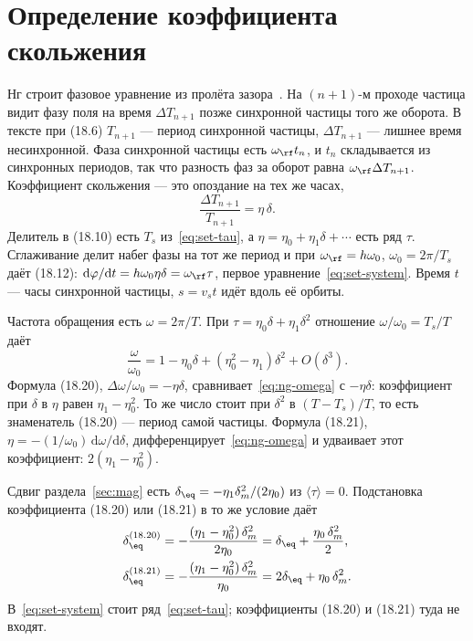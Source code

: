 \section{Определение коэффициента скольжения}
\label{sec:ng}

Нг строит фазовое уравнение из пролёта зазора~\cite{Ng2006}. На $(n{+}1)$-м проходе частица видит фазу поля на время $\Delta T_{n+1}$ позже синхронной частицы того же оборота. В тексте при (18.6) $T_{n+1}$ --- период синхронной частицы, $\Delta T_{n+1}$ --- лишнее время несинхронной. Фаза синхронной частицы есть $\omega_\rf t_n$, и $t_n$ складывается из синхронных периодов, так что разность фаз за оборот равна $\omega_\rf\Delta T_{n+1}$. Коэффициент скольжения --- это опоздание на тех же часах,
\begin{equation}
\label{eq:ng-def}
\frac{\Delta T_{n+1}}{T_{n+1}}=\eta\,\delta.
\end{equation}
Делитель в (18.10) есть $T_s$ из~\eqref{eq:set-tau}, а $\eta=\eta_0+\eta_1\delta+\cdots$ есть ряд $\tau$. Сглаживание делит набег фазы на тот же период и при $\omega_\rf=h\omega_0$, $\omega_0=2\pi/T_s$ даёт (18.12): $\mathrm{d}\varphi/\mathrm{d}t=h\omega_0\eta\delta=\omega_\rf\tau$, первое уравнение~\eqref{eq:set-system}. Время $t$ --- часы синхронной частицы, $s=v_s t$ идёт вдоль её орбиты.

Частота обращения есть $\omega=2\pi/T$. При $\tau=\eta_0\delta+\eta_1\delta^2$ отношение $\omega/\omega_0=T_s/T$ даёт
\begin{equation}
\label{eq:ng-omega}
\frac{\omega}{\omega_0}
=1-\eta_0\delta+(\eta_0^2-\eta_1)\delta^2+O(\delta^3).
\end{equation}
Формула (18.20), $\Delta\omega/\omega_0=-\eta\delta$, сравнивает~\eqref{eq:ng-omega} с $-\eta\delta$: коэффициент при $\delta$ в $\eta$ равен $\eta_1-\eta_0^2$. То же число стоит при $\delta^2$ в $(T-T_s)/T$, то есть знаменатель (18.20) --- период самой частицы. Формула (18.21), $\eta=-(1/\omega_0)\,\mathrm{d}\omega/\mathrm{d}\delta$, дифференцирует~\eqref{eq:ng-omega} и удваивает этот коэффициент: $2(\eta_1-\eta_0^2)$.

Сдвиг раздела~\ref{sec:mag} есть $\delta_\eq=-\eta_1\delta_m^2/(2\eta_0)$ из $\langle\tau\rangle=0$. Подстановка коэффициента (18.20) или (18.21) в то же условие даёт
\begin{align}
\label{eq:ng-deq}
\delta_\eq^{(18.20)}
&=-\frac{(\eta_1-\eta_0^2)\,\delta_m^2}{2\eta_0}
=\delta_\eq+\frac{\eta_0\,\delta_m^2}{2},
\\
\delta_\eq^{(18.21)}
&=-\frac{(\eta_1-\eta_0^2)\,\delta_m^2}{\eta_0}
=2\delta_\eq+\eta_0\,\delta_m^2.
\end{align}
В~\eqref{eq:set-system} стоит ряд~\eqref{eq:set-tau}; коэффициенты (18.20) и (18.21) туда не входят.

